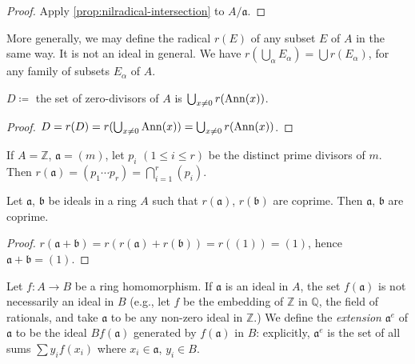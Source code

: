 \begin{proof}
    Apply \eqref{prop:nilradical-intersection} to $A/\mathfrak{a}$.
\end{proof}

More generally, we may define the radical $r(E)$ of any subset $E$ of $A$ in the same way. It is not an ideal in general. We have $r(\bigcup_\alpha E_\alpha) = \bigcup r(E_\alpha)$, for any family of subsets $E_\alpha$ of $A$.

\begin{proposition}\label{prop:zerodivisors-union}
    $D\coloneqq$ the set of zero-divisors of $A$ is $\bigcup_{x \neq 0} r(\operatorname{Ann}(x))$.
\end{proposition}

\begin{proof}
$D = r(D) = r(\bigcup_{x \neq 0} \operatorname{Ann}(x)) = \bigcup_{x \neq 0} r(\operatorname{Ann}(x))$.
\end{proof}

\begin{example}
    If $A = \mathbb{Z}$, $\mathfrak{a} = (m)$, let $p_i$ $(1 \le i \le r)$ be the distinct prime divisors of $m$. Then $r(\mathfrak{a}) = (p_1 \cdots p_r) = \bigcap_{i=1}^{r} (p_i)$.
\end{example}

\begin{proposition}\label{prop:coprime-radicals}
    Let $\mathfrak{a}$, $\mathfrak{b}$ be ideals in a ring $A$ such that $r(\mathfrak{a})$, $r(\mathfrak{b})$ are coprime. Then $\mathfrak{a}$, $\mathfrak{b}$ are coprime.
\end{proposition}

\begin{proof}
$r(\mathfrak{a} + \mathfrak{b}) = r(r(\mathfrak{a}) + r(\mathfrak{b})) = r((1)) = (1)$, hence $\mathfrak{a} + \mathfrak{b} = (1)$.
\end{proof}


Let $f \colon A \to B$ be a ring homomorphism. If $\mathfrak{a}$ is an ideal in $A$, the set $f(\mathfrak{a})$ is not necessarily an ideal in $B$ (e.g., let $f$ be the embedding of $\mathbb{Z}$ in $\mathbb{Q}$, the field of rationals, and take $\mathfrak{a}$ to be any non-zero ideal in $\mathbb{Z}$.) We define the \emph{extension} $\mathfrak{a}^e$ of $\mathfrak{a}$ to be the ideal $Bf(\mathfrak{a})$ generated by $f(\mathfrak{a})$ in $B$: explicitly, $\mathfrak{a}^e$ is the set of all sums $\sum y_i f(x_i)$ where $x_i \in \mathfrak{a}$, $y_i \in B$.

